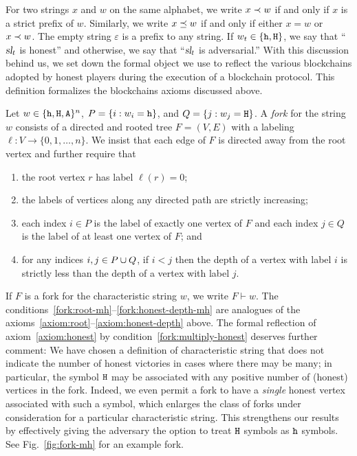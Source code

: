 For two strings $x$ and $w$ on the same alphabet, 
we write $x \prec w$ if and only if $x$ is a strict prefix of $w$. 
Similarly, 
we write $x \preceq w$ if and only if either $x = w$ or $x \prec w$. 
The empty string $\varepsilon$ is a prefix to any string. 
If $w_t \in \{\mathtt{h}, \mathtt{H}\}$, we say that ``$\textsl{sl}_t$ is honest'' and 
otherwise, we say that ``$\textsl{sl}_t$ is adversarial.'' 
With this discussion behind us, we set down the formal object we use
to reflect the various blockchains adopted by honest players during
the execution of a blockchain protocol. This definition formalizes the blockchains axioms discussed above.


\begin{definition}[Fork]\label{def:fork}
  Let $w\in \{\mathtt{h}, \mathtt{H}, \mathtt{A}\}^n$, $P = \{ i : w_i = \mathtt{h}\}$, and $Q = \{ j : w_j = \mathtt{H}\}$. 
  A \emph{fork} for the string $w$ consists of a directed and rooted
  tree $F=(V,E)$ with a labeling $\ell:V\to\{0,1,\dots,n\}$. We insist
  that each edge of $F$ is directed away from the root vertex and
  further require that
  \begin{enumerate}[label=(F{\arabic*})]
    \item\label{fork:root-mh} the root vertex $r$ has label $\ell(r)=0$;

    \item\label{fork:monotone-mh} the labels of vertices along any directed path are strictly increasing;

    \item\label{fork:unique-honest-mh}\label{fork:multiply-honest}
    each index $i\in P$ 
    is the label of exactly one vertex of $F$ 
    and 
    each index $j\in Q$ 
    is the label of at least one vertex of $F$; and 

    \item\label{fork:honest-depth-mh} 
    for any indices $i,j\in P \cup Q$, 
    if $i<j$ then 
    the depth of a vertex with label $i$ 
    is strictly less than 
    the depth of a vertex with label $j$.
  \end{enumerate}
\end{definition}

If $F$ is a fork for the characteristic string $w$, we write
$F\vdash w$.  The conditions~\ref{fork:root-mh}--\ref{fork:honest-depth-mh}
are analogues of the axioms~\ref{axiom:root}--\ref{axiom:honest-depth}
above. The formal reflection of axiom~\ref{axiom:honest} by
condition~\ref{fork:multiply-honest} deserves further comment: We have
chosen a definition of characteristic string that does not indicate
the number of honest victories in cases where there may be many; in
particular, the symbol $\mathtt{H}$ may be associated with any positive number
of (honest) vertices in the fork. Indeed, we even permit a fork to
have a \emph{single} honest vertex associated with such a symbol,
which enlarges the class of forks under consideration for a particular
characteristic string. This strengthens our results by effectively
giving the adversary the option to treat $\mathtt{H}$ symbols as $\mathtt{h}$
symbols. See Fig.~\ref{fig:fork-mh}
for an example fork. 

